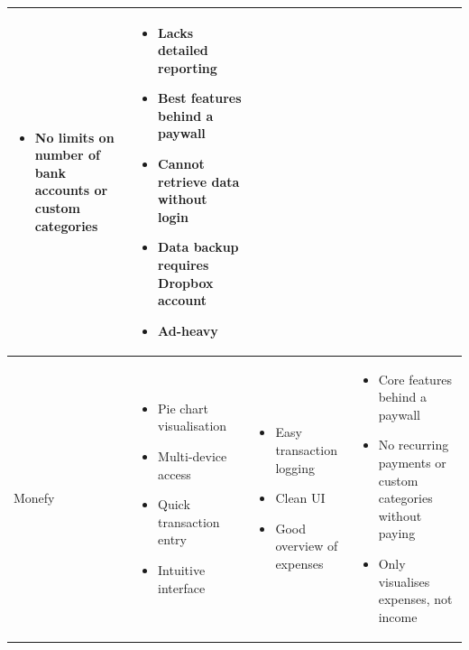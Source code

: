 \documentclass{l4proj}
\begin{document}
\begin{tabular}{|p{3cm}|p{3.5cm}|p{3.5cm}|p{3.5cm}|}
\begin{itemize}[noitemsep, topsep=0pt, left=0pt]
        \item No limits on number of bank accounts or custom categories
    \end{itemize} &
    \begin{itemize}[noitemsep, topsep=0pt, left=0pt]
        \item Lacks detailed reporting
        \item Best features behind a paywall
        \item Cannot retrieve data without login
        \item Data backup requires Dropbox account
        \item Ad-heavy
    \end{itemize} \\
    \hline
    Monefy &
    \begin{itemize}[noitemsep, topsep=0pt, left=0pt]
        \item Pie chart visualisation
        \item Multi-device access
        \item Quick transaction entry
        \item Intuitive interface
    \end{itemize} &
    \begin{itemize}[noitemsep, topsep=0pt, left=0pt]
        \item Easy transaction logging
        \item Clean UI
        \item Good overview of expenses
    \end{itemize} &
    \begin{itemize}[noitemsep, topsep=0pt, left=0pt]
        \item Core features behind a paywall
        \item No recurring payments or custom categories without paying
        \item Only visualises expenses, not income
    \end{itemize} \\
    \hline
\end{tabular}
\end{document}
